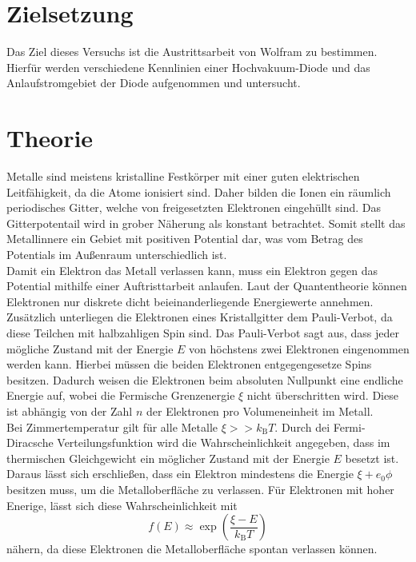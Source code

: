 \nocite{anleitungV504}
\section{Zielsetzung}
\label{sec:Zielsetzung}
Das Ziel dieses Versuchs ist die Austrittsarbeit von Wolfram zu bestimmen. Hierfür werden verschiedene Kennlinien einer Hochvakuum-Diode und
das Anlaufstromgebiet der Diode aufgenommen und untersucht. 


\section{Theorie}
\label{sec:Theorie}
Metalle sind meistens kristalline Festkörper mit einer guten elektrischen Leitfähigkeit, 
da die Atome ionisiert sind. Daher bilden die Ionen ein räumlich periodisches Gitter, welche von
freigesetzten Elektronen eingehüllt sind. Das Gitterpotentail wird in grober Näherung als konstant betrachtet.
Somit stellt das Metallinnere ein Gebiet mit positiven Potential dar, was vom Betrag des Potentials im Außenraum 
unterschiedlich ist.\\
Damit ein Elektron das Metall verlassen kann, muss ein Elektron gegen das Potential mithilfe einer
Auftristtarbeit anlaufen. Laut der Quantentheorie können Elektronen nur diskrete dicht beieinanderliegende Energiewerte 
annehmen. Zusätzlich unterliegen die Elektronen eines Kristallgitter dem Pauli-Verbot, da diese Teilchen mit halbzahligen Spin
sind. Das Pauli-Verbot sagt aus, dass jeder mögliche Zustand mit der Energie 
$E$ von höchstens zwei Elektronen eingenommen werden kann. Hierbei müssen die beiden Elektronen entgegengesetze Spins besitzen.
Dadurch weisen die Elektronen beim absoluten Nullpunkt eine endliche Energie auf, wobei die Fermische Grenzenergie $\xi$ nicht überschritten
wird. Diese ist abhängig von der Zahl $n$ der Elektronen pro Volumeneinheit im Metall.
\\
Bei Zimmertemperatur gilt für alle Metalle $\xi >> k_{\text{B}}T$. Durch dei Fermi-Diracsche Verteilungsfunktion
wird die Wahrscheinlichkeit angegeben, dass im thermischen Gleichgewicht ein möglicher Zustand mit der Energie $E$ besetzt ist. 
Daraus lässt sich erschließen, dass ein Elektron mindestens die Energie $\xi + e_0 \phi$ besitzen muss, um die Metalloberfläche zu verlassen.
Für Elektronen mit hoher Enerige, lässt sich diese Wahrscheinlichkeit mit 
\begin{equation}
    f(E)\approx \exp\left( \frac{\xi - E}{k_{\text{B}}T}\right)
    \label{eqn:Wahrscheinlichkeit_hoheEnergie}
\end{equation}
nähern, da diese Elektronen die Metalloberfläche spontan verlassen können.

